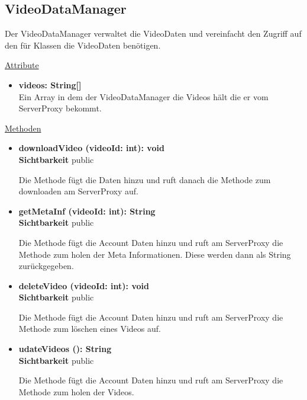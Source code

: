 \newpage
\subsection{VideoDataManager}\label{VideoDataManager}
Der VideoDataManager verwaltet die VideoDaten und vereinfacht den Zugriff auf den  für Klassen die VideoDaten benötigen.

\underline{Attribute}
\begin{itemize}
\itemsep0pt

\item \textbf{videos: String[]}\hfill\\
Ein Array in dem der VideoDataManager die Videos hält die er vom ServerProxy bekommt.
\end{itemize}

\underline{Methoden}
\begin{itemize}
\itemsep0pt


\item \textbf{downloadVideo (videoId: int): void}\hfill\\
\textbf{Sichtbarkeit} public

Die Methode fügt die  Daten hinzu und ruft danach die Methode zum downloaden am ServerProxy auf.

\item \textbf{getMetaInf (videoId: int): String}\hfill\\
\textbf{Sichtbarkeit} public

Die Methode fügt die Account Daten hinzu und ruft am ServerProxy die Methode zum holen der Meta Informationen. Diese werden dann als String zurückgegeben.

\item \textbf{deleteVideo (videoId: int): void}\hfill\\
\textbf{Sichtbarkeit} public

Die Methode fügt die Account Daten hinzu und ruft am ServerProxy die Methode zum löschen eines Videos auf.

\item \textbf{udateVideos (): String}\hfill\\
\textbf{Sichtbarkeit} public

Die Methode fügt die Account Daten hinzu und ruft am ServerProxy die Methode zum holen der Videos.

\end{itemize}